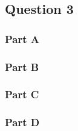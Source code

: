 \newpage
\subsection{Question 3}
\subsubsection{Part A}

\newpage
\subsubsection{Part B}

\newpage
\subsubsection{Part C}

\newpage
\subsubsection{Part D}




%


